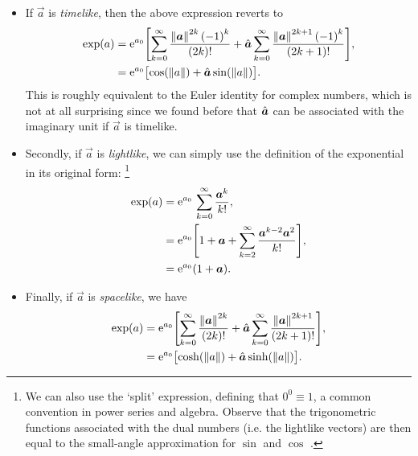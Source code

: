 \begin{itemize}
    \item If \(\vec{a}\) is \emph{timelike}, then the above expression reverts to
        \begin{equation}
            \begin{split}
                \exp(a) &= \ec^{a_0}\qty[\sum_{k=0}^\infty \frac{\norm{\vec{a}}^{2k}\,\qty(-1)^k}{(2k)!} + \uvec{a}\sum_{k=0}^\infty \frac{\norm{\vec{a}}^{2k+1} \, \qty(-1)^k}{(2k+1)!}], \\
                        &= \ec^{a_0}\qty\big[\cos(\norm{a})  + \uvec{a}\sin(\norm{a})]. \\
            \end{split}
        \end{equation}
        This is roughly equivalent to the Euler identity for complex numbers, which is not at all surprising since we found before that \(\uvec{a}\) can be associated with the imaginary unit if \(\vec{a}\) is timelike.
    \item Secondly, if \(\vec{a}\) is \emph{lightlike}, we can simply use the definition of the exponential in its original form: \footnote{We can also use the `split' expression, defining that \(0^0 \equiv 1\), a common convention in power series and algebra. Observe that the trigonometric functions associated with the dual numbers (i.e. the lightlike vectors) are then equal to the small-angle approximation for \(\sin\) and \(\cos\) \cite{Graham1994, Harkin2004}.}
        \begin{equation}
            \begin{split}
                \exp(a) &= \ec^{a_0}\,\sum^{\infty}_{k=0} \frac{\vec{a}^k}{k!}, \\
                        &= \ec^{a_0}\qty[1 + \vec{a} + \sum^{\infty}_{k=2} \frac{\vec{a}^{k-2}\vec{a}^2}{k!}], \\
                        &= \ec^{a_0}\qty(1 + \vec{a}). \\
            \end{split}
        \end{equation}
    \item Finally, if \(\vec{a}\) is \emph{spacelike}, we have
        \begin{equation}
            \begin{split}
                \exp(a) &= \ec^{a_0}\qty[\sum_{k=0}^\infty \frac{\norm{\vec{a}}^{2k}}{(2k)!} 
                           + \uvec{a}\sum_{k=0}^\infty \frac{\norm{\vec{a}}^{2k+1}}{(2k+1)!}], \\
                        &= \ec^{a_0}\qty\big[\cosh(\norm{a}) + \uvec{a}\sinh(\norm{a})]. \\
            \end{split}
        \end{equation}
\end{itemize}
